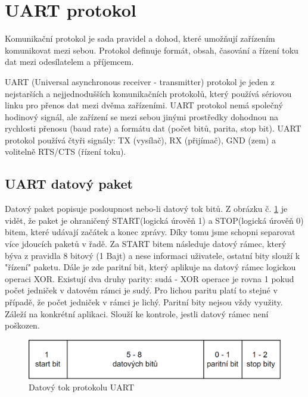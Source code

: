 \section{UART protokol}
\label{UART protokol}
Komunikační protokol je sada pravidel a dohod, které umožňují zařízením komunikovat mezi sebou. Protokol definuje formát, obsah, časování a řízení toku dat mezi odesílatelem a příjemcem.

UART (Universal asynchronous receiver - transmitter) protokol je jeden z nejstarších a nejjednodušších komunikačních protokolů, který používá sériovou linku pro přenos dat mezi dvěma zařízeními. UART protokol nemá společný hodinový signál, ale zařízení se mezi sebou jinými prostředky dohodnou na rychlosti přenosu (baud rate) a formátu dat (počet bitů, parita, stop bit). UART protokol používá čtyři signály: TX (vysílač), RX (přijímač), GND (zem) a volitelně RTS/CTS (řízení toku). \cite{ser kom} %

\subsection{UART datový paket}
\label{UARTt}
Datový paket popisuje posloupnost nebo-li datový tok bitů. Z obrázku č. \ref{UART packet} je vidět, že paket je ohraničený START(logická úrověň 1) a STOP(logická úrověň 0) bitem, které udávají začátek a konec zprávy. Díky tomu jsme schopni separovat více jdoucích paketů v řadě. Za START bitem následuje datový rámec, který býva z pravidla 8 bitový (1 Bajt) a nese informaci uživatele, ostatní bity slouží k "řízení" paketu. Dále je zde paritní bit, který aplikuje na datový rámec logickou operaci XOR. Existují dva druhy parity: sudá - XOR operace je rovna 1 pokud počet jedniček v datovém rámci je sudý.  Pro lichou paritu platí to stejné v případě, že počet jedniček v rámci je lichý. Paritní bity nejsou vždy využity. Záleží na konkrétní aplikaci. Slouží ke kontrole, jestli datový rámec není poškozen. \cite{ser kom} %

\begin{figure}[!h]
    \begin{center}
        \includegraphics[scale=0.5]{obrazky/datovy ramec UART - final.png}
    \end{center}
    \caption{Datový tok protokolu UART}
    \label{UART packet}
\end{figure}

